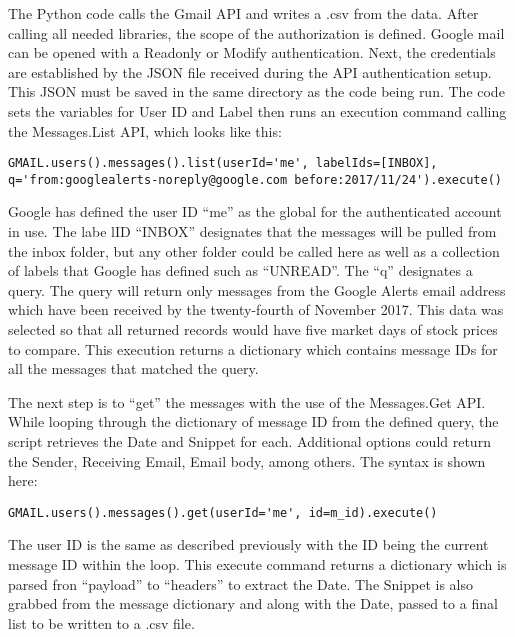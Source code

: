 \documentclass[sigconf]{acmart}
\begin{document}
The Python code calls the Gmail API and writes a .csv from the data. After calling all needed libraries, the scope of the authorization is defined. Google mail can be opened with a Readonly or Modify authentication. Next, the credentials are established by the JSON file received during the API authentication setup. This JSON must be saved in the same directory as the code being run. The code sets the variables for User ID and Label then runs an execution command calling the  Messages.List API, which looks like this:
\begin{lstlisting}
GMAIL.users().messages().list(userId='me', labelIds=[INBOX], q='from:googlealerts-noreply@google.com before:2017/11/24').execute()
\end{lstlisting}
Google has defined the user ID ``me'' as the global for the authenticated account in use. The labe lID ``INBOX'' designates that the messages will be pulled from the inbox folder, but any other folder could be called here as well as a collection of labels that Google has defined such as ``UNREAD''. The ``q'' designates a query. The query will return only messages from the Google Alerts email address which have been received by the twenty-fourth of November 2017. This data was selected so that all returned records would have five market days of stock prices to compare. This execution returns a dictionary which contains message IDs for all the messages that matched the query.

The next step is to ``get'' the messages with the use of the Messages.Get API. While looping through the dictionary of message ID from the defined query, the script retrieves the Date and Snippet for each. Additional options could return the Sender, Receiving Email, Email body, among others. The syntax is shown here:
\begin{lstlisting}
GMAIL.users().messages().get(userId='me', id=m_id).execute()
\end{lstlisting}
The user ID is the same as described previously with the ID being the current message ID within the loop. This execute command returns a dictionary which is parsed fron ``payload'' to ``headers'' to extract the Date. The Snippet is also grabbed from the message dictionary and along with the Date, passed to a final list to be written to a .csv file. 
\end{document}
